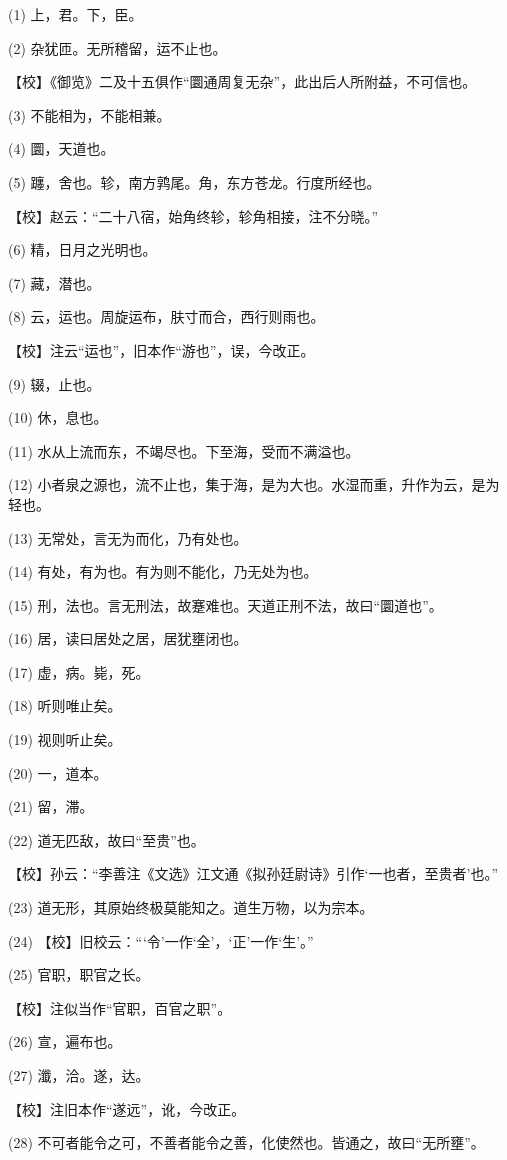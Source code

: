 \documentclass[12pt,UTF8]{ctexbook}
\begin{document}
(1) 上，君。下，臣。

(2) 杂犹匝。无所稽留，运不止也。

【校】《御览》二及十五俱作“圜通周复无杂”，此出后人所附益，不可信也。

(3) 不能相为，不能相兼。

(4) 圜，天道也。

(5) 躔，舍也。轸，南方鹑尾。角，东方苍龙。行度所经也。

【校】赵云：“二十八宿，始角终轸，轸角相接，注不分晓。”

(6) 精，日月之光明也。

(7) 藏，潜也。

(8) 云，运也。周旋运布，肤寸而合，西行则雨也。

【校】注云“运也”，旧本作“游也”，误，今改正。

(9) 辍，止也。

(10) 休，息也。

(11) 水从上流而东，不竭尽也。下至海，受而不满溢也。

(12) 小者泉之源也，流不止也，集于海，是为大也。水湿而重，升作为云，是为轻也。

(13) 无常处，言无为而化，乃有处也。

(14) 有处，有为也。有为则不能化，乃无处为也。

(15) 刑，法也。言无刑法，故蹇难也。天道正刑不法，故曰“圜道也”。

(16) 居，读曰居处之居，居犹壅闭也。

(17) 虚，病。毙，死。

(18) 听则唯止矣。

(19) 视则听止矣。

(20) 一，道本。

(21) 留，滞。

(22) 道无匹敌，故曰“至贵”也。

【校】孙云：“李善注《文选》江文通《拟孙廷尉诗》引作‘一也者，至贵者’也。”

(23) 道无形，其原始终极莫能知之。道生万物，以为宗本。

(24) 【校】旧校云：“‘令’一作‘全’，‘正’一作‘生’。”

(25) 官职，职官之长。

【校】注似当作“官职，百官之职”。

(26) 宣，遍布也。

(27) 瀸，洽。遂，达。

【校】注旧本作“遂远”，讹，今改正。

(28) 不可者能令之可，不善者能令之善，化使然也。皆通之，故曰“无所壅”。
\end{document}
